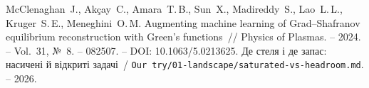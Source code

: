  McClenaghan~J., Akçay~C., Amara~T.\,B., Sun~X., Madireddy~S., Lao~L.\,L., Kruger~S.\,E., Meneghini~O.\,M. Augmenting machine learning of Grad--Shafranov equilibrium reconstruction with Green's functions~// Physics of Plasmas. -- 2024. -- Vol.~31, №~8. -- 082507. -- DOI: 10.1063/5.0213625.
 Де стеля і де запас: насичені й відкриті задачі~/ \texttt{Our try/01-landscape/saturated-vs-headroom.md}. -- 2026.
